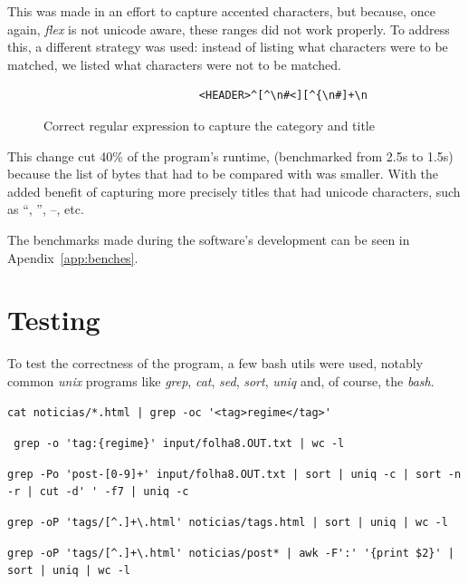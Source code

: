 \documentclass[a4paper]{report}
\begin{document}
This was made in an effort to capture accented characters, but because, once
again, \textit{flex} is not unicode aware, these ranges did not work properly.
To address this, a different strategy was used: instead of listing what
characters were to be matched, we listed what characters were not to be
matched.

\begin{figure}[H]
    \centering
    \begin{verbatim}
                        <HEADER>^[^\n#<][^{\n#]+\n
    \end{verbatim}
    \caption{Correct regular expression to capture the category and title}\label{fig:new-regex}
\end{figure}

This change cut 40\% of the program's runtime, (benchmarked from 2.5s to 1.5s)
because the list of bytes that had to be compared with was smaller. With the
added benefit of capturing more precisely titles that had unicode characters,
such as  ``,  '', --, etc.

The benchmarks made during the software's development can be seen in Apendix~\ref{app:benches}.

\chapter{Testing}

To test the correctness of the program, a few bash utils were used, notably common \textit{unix} programs like \textit{grep}, \textit{cat}, \textit{sed}, \textit{sort}, \textit{uniq} and, of course, the \textit{bash}.

\verb!cat noticias/*.html | grep -oc '<tag>regime</tag>'!

\verb! grep -o 'tag:{regime}' input/folha8.OUT.txt | wc -l!

\verb!grep -Po 'post-[0-9]+' input/folha8.OUT.txt | sort | uniq -c | sort -n -r | cut -d' ' -f7 | uniq -c!

\verb!grep -oP 'tags/[^.]+\.html' noticias/tags.html | sort | uniq | wc -l!

\verb!grep -oP 'tags/[^.]+\.html' noticias/post* | awk -F':' '{print $2}' | sort | uniq | wc -l!
\end{document}
